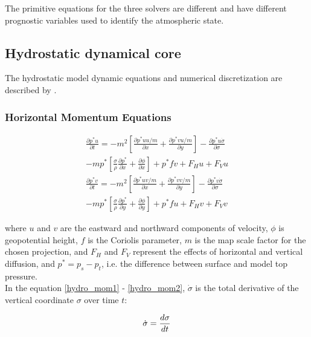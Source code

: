 The primitive equations for the three solvers are different and have different
prognostic variables used to identify the atmospheric state.

\subsection{Hydrostatic dynamical core}
The hydrostatic model dynamic equations and numerical discretization are
described by \cite{Grell_94}.

\subsubsection{Horizontal Momentum Equations}

\begin{gather}
\label{hydro_mom1}
  \frac{\partial{p^{\ast}u}}{\partial{t}} =
  -m^2 \left[ \frac{\partial{p^{\ast}uu/m}}{\partial{x}} + 
    \frac{\partial{p^{\ast}vu/m}}{\partial{y}} \right] -
    \frac{\partial{p^{\ast}u \dot{\sigma}}}{\partial{\sigma}}
      \\ \nonumber
      -mp^{\ast} \left[ \frac{\sigma}{\rho}
      \frac{\partial{p^{\ast}}}{\partial{x}} +
      \frac{\partial{\phi}}{\partial{x}} \right] +
  p^{\ast}fv + F_Hu + F_Vu \\
\label{hydro_mom2}
  \frac{\partial{p^{\ast}v}}{\partial{t}} = 
  -m^2 \left[ \frac{\partial{p^{\ast}uv/m}}{\partial{x}} +
    \frac{\partial{p^{\ast}vv/m}}{\partial{y}} \right] -
    \frac{\partial{p^{\ast}v\dot{\sigma}}}{\partial{\sigma}}
     \\ \nonumber
     -mp^{\ast} \left[ \frac{\sigma}{\rho}
         \frac{\partial{p^{\ast}}}{\partial{y}} +
      \frac{\partial{\phi}}{\partial{y}} \right]
  + p^{\ast}fu + F_Hv + F_Vv
\end{gather}

where $u$ and $v$ are the eastward and northward components of
velocity, $\phi$ is geopotential height, $f$ is the Coriolis parameter,
$m$ is the map scale factor for the chosen projection, and $F_H$ and $F_V$
represent the effects of horizontal and vertical diffusion, and
$p^{\ast} = p_s-p_t$, i.e. the difference between surface and model top
pressure.  \\

In the equation \ref{hydro_mom1} - \ref{hydro_mom2}, $\dot{\sigma}$ is the total
derivative of the vertical coordinate $\sigma$ over time $t$:

\begin{equation}
\dot{\sigma} = {d\sigma \over dt}
\end{equation}

